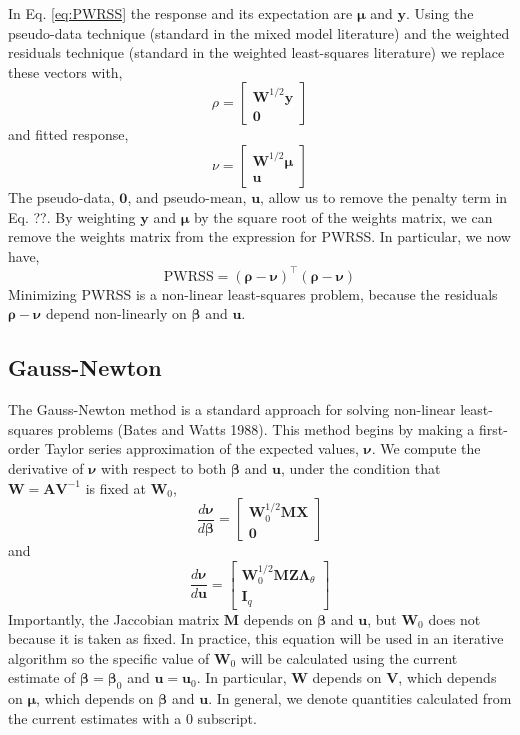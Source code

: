 \documentclass{jss}
\begin{document}
In Eq. \ref{eq:PWRSS} the response and its expectation are $\bm\mu$ and $\bm
y$. Using the pseudo-data technique (standard in the mixed model
literature) and the weighted residuals technique (standard in the
weighted least-squares literature) we replace these vectors with,
\begin{equation}
\rho = 
\begin{bmatrix}
\bm W^{1/2}\bm y \\
\bm 0
\end{bmatrix}
\end{equation}
and fitted response,
\begin{equation}
\nu = 
\begin{bmatrix}
\bm W^{1/2}\bm \mu \\
\bm u
\end{bmatrix}
\end{equation}
The pseudo-data, $\bm 0$, and pseudo-mean, $\bm u$, allow us to remove
the penalty term in Eq. ??.  By weighting $\bm y$ and $\bm\mu$ by the
square root of the weights matrix, we can remove the weights matrix
from the expression for PWRSS. In particular, we now have,
\begin{equation}
\mathrm{PWRSS} = (\bm\rho - \bm\nu)^\top (\bm\rho - \bm\nu)
\end{equation}
Minimizing PWRSS is a non-linear least-squares problem, because the
residuals $\bm\rho - \bm\nu$ depend non-linearly on $\bm\beta$ and
$\bm u$.

\subsection{Gauss-Newton}

The Gauss-Newton method is a standard approach for solving non-linear
least-squares problems (Bates and Watts 1988). This method begins by
making a first-order Taylor series approximation of the expected
values, $\bm\nu$. We compute the derivative of $\bm\nu$ with respect
to both $\bm\beta$ and $\bm u$, under the condition that $\bm W = \bm
A \bm V^{-1}$ is fixed at $\bm W_0$,
\begin{displaymath}
\frac{d \bm\nu}{d \bm\beta} = 
\begin{bmatrix}
\bm W_0^{1/2}\bm M \bm X \\
\bm 0
\end{bmatrix}
\end{displaymath}
and 
\begin{displaymath}
\frac{d \bm\nu}{d \bm u} = 
\begin{bmatrix}
\bm W_0^{1/2}\bm M \bm Z \bm\Lambda_\theta \\
\bm I_q
\end{bmatrix}
\end{displaymath}
Importantly, the Jaccobian matrix $\bm M$ depends on $\bm\beta$ and
$\bm u$, but $\bm W_0$ does not because it is taken as
fixed. In practice, this equation will be used in an iterative
algorithm so the specific value of $\bm W_0$ will be calculated
using the current estimate of $\bm\beta = \bm\beta_0$ and $\bm u  =
\bm u_0$. In particular, $\bm W$ depends on $\bm V$, which depends on
$\bm\mu$, which depends on $\bm\beta$ and $\bm u$. In general, we
denote quantities calculated from the current estimates with a $0$
subscript.
\end{document}
